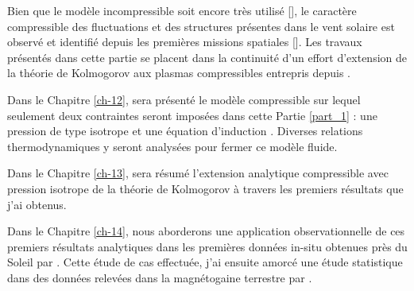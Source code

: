 Bien que le modèle incompressible soit encore très utilisé [\cite{marino_scaling_2023}], le caractère compressible des fluctuations et des structures présentes dans le vent solaire est observé et identifié depuis les premières missions spatiales [\cite{tu_mhd_1995}]. Les travaux présentés dans cette partie se placent dans la continuité d'un effort d'extension de la théorie de Kolmogorov aux plasmas compressibles entrepris depuis \cite{banerjee_exact_2013}. 

Dans le Chapitre \ref{ch-12}, sera présenté le modèle compressible sur lequel seulement deux contraintes seront imposées dans cette Partie \ref{part_1} : une pression de type isotrope et une équation d'induction . Diverses relations thermodynamiques y seront analysées pour fermer ce modèle fluide. 

Dans le Chapitre \ref{ch-13}, sera résumé l'extension analytique compressible avec pression isotrope de la théorie de Kolmogorov à travers les premiers résultats que j'ai obtenus. 

Dans le Chapitre \ref{ch-14}, nous aborderons une application observationnelle de ces premiers résultats analytiques dans les premières données in-situ obtenues près du Soleil par . Cette étude de cas effectuée, j'ai ensuite amorcé une étude statistique dans des données relevées dans la magnétogaine terrestre par . 

         
